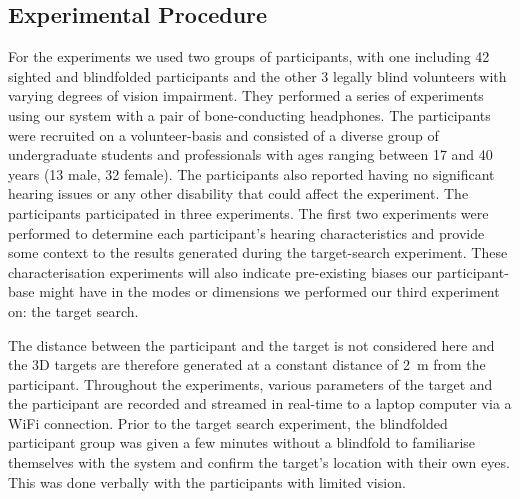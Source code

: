 \documentclass[sigconf, review=true, screen=true, anonymous=true]{acmart}
\begin{document}
\subsection{Experimental Procedure}

For the experiments we used two groups of participants, with one including 42 sighted and blindfolded participants and the other 3 legally blind volunteers with varying degrees of vision impairment. 
They performed a series of experiments using our system with a pair of bone-conducting headphones.
The participants were recruited on a volunteer-basis and consisted of a diverse group of undergraduate students and professionals with ages ranging between 17 and 40 years (13 male, 32 female).
The participants also reported having no significant hearing issues or any other disability that could affect the experiment.
The participants participated in three experiments.
The first two experiments were performed to determine each participant's hearing characteristics and provide some context to the results generated during the target-search experiment.
These characterisation experiments will also indicate pre-existing biases our participant-base might have in the modes or dimensions we performed our third experiment on: the target search. 


The distance between the participant and the target is not considered here and the 3D targets are therefore generated at a constant distance of \SI{2}{\metre} from the participant.
Throughout the experiments, various parameters of the target and the participant are recorded and streamed in real-time to a laptop computer via a WiFi connection.
Prior to the target search experiment, the blindfolded participant group was given a few minutes without a blindfold to familiarise themselves with the system and confirm the target's location with their own eyes.
This was done verbally with the participants with limited vision. 
\end{document}

